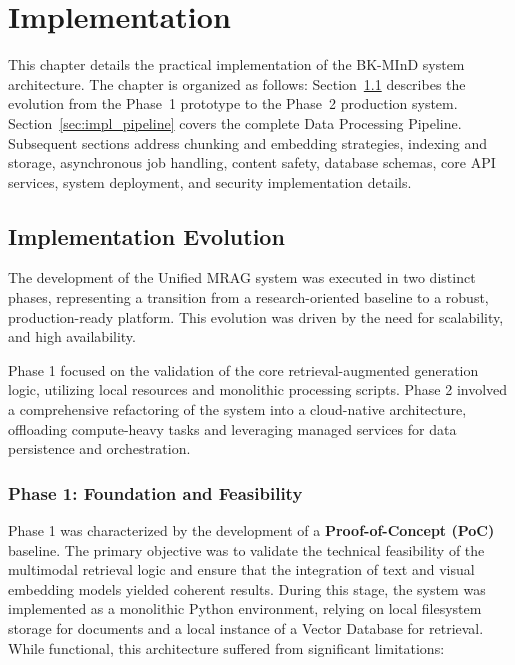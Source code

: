 ﻿\chapter{Implementation}

This chapter details the practical implementation of the BK-MInD system architecture. The chapter is organized as follows: Section~\ref{sec:impl_evolution} describes the evolution from the Phase~1 prototype to the Phase~2 production system. Section~\ref{sec:impl_pipeline} covers the complete Data Processing Pipeline. Subsequent sections address chunking and embedding strategies, indexing and storage, asynchronous job handling, content safety, database schemas, core API services, system deployment, and security implementation details.

\section{Implementation Evolution}\label{sec:impl_evolution}

The development of the Unified MRAG system was executed in two distinct phases, representing a transition from a research-oriented baseline to a robust, production-ready platform. This evolution was driven by the need for scalability, and high availability.

Phase 1 focused on the validation of the core retrieval-augmented generation logic, utilizing local resources and monolithic processing scripts. Phase 2 involved a comprehensive refactoring of the system into a cloud-native architecture, offloading compute-heavy tasks and leveraging managed services for data persistence and orchestration.

\subsection{Phase 1: Foundation and Feasibility}

Phase 1 was characterized by the development of a \textbf{Proof-of-Concept (PoC)} baseline. The primary objective was to validate the technical feasibility of the multimodal retrieval logic and ensure that the integration of text and visual embedding models yielded coherent results. During this stage, the system was implemented as a monolithic Python environment, relying on local filesystem storage for documents and a local instance of a Vector Database for retrieval. While functional, this architecture suffered from significant limitations:

